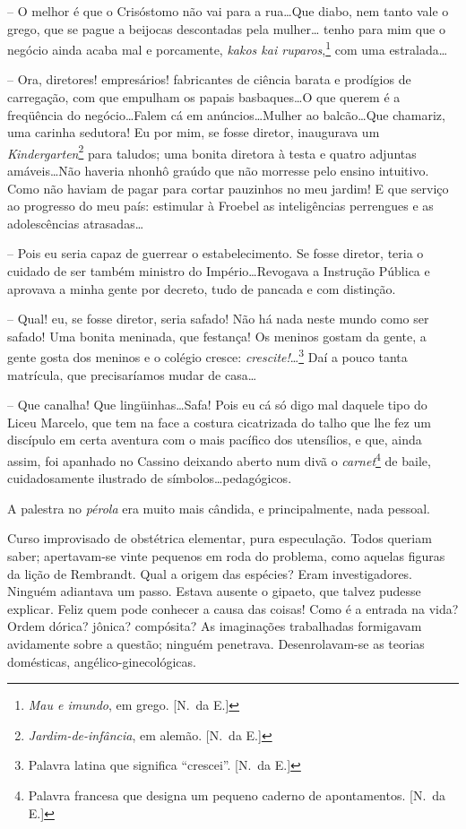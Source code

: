 -- O melhor é que o Crisóstomo não vai para a rua\ldots Que diabo, nem
tanto vale o grego, que se pague a beijocas descontadas pela mulher\ldots
tenho para mim que o negócio ainda acaba mal e porcamente, \textit{kakos kai
ruparos},\footnote{ \textit{Mau e imundo}, em grego. [N.~da E.]} com uma estralada\ldots 

-- Ora, diretores! empresários!
fabricantes de ciência barata e prodígios de carregação, com que
empulham os papais basbaques\ldots O que querem é a freqüência do
negócio\ldots Falem cá em anúncios\ldots Mulher ao balcão\ldots Que chamariz,
uma carinha sedutora! Eu por mim, se fosse diretor, inaugurava um
\textit{Kindergarten}\footnote{ \textit{Jardim-de-infância}, em alemão. [N.~da E.]} 
para taludos; uma bonita diretora à testa e quatro
adjuntas amáveis\ldots Não haveria nhonhô graúdo que não morresse pelo
ensino intuitivo. Como não haviam de pagar para cortar pauzinhos no meu
jardim! E que serviço ao progresso do meu país: estimular à Froebel as
inteligências perrengues e as adolescências atrasadas\ldots 

-- Pois eu seria capaz de guerrear o estabelecimento. Se fosse diretor, 
teria o cuidado de ser também ministro do Império\ldots Revogava a Instrução
Pública e aprovava a minha gente por decreto, tudo de pancada e com
distinção. 

-- Qual! eu, se fosse diretor, seria safado! Não há nada
neste mundo como ser safado! Uma bonita meninada, que festança! Os
meninos gostam da gente, a gente gosta dos meninos e o colégio cresce:
\textit{crescite!}\ldots\footnote{ Palavra latina que significa ``crescei''. 
[N.~da E.]} Daí a pouco tanta matrícula, que precisaríamos mudar de casa\ldots 

-- Que canalha! Que lingüinhas\ldots Safa! Pois eu cá só digo mal
daquele tipo do Liceu Marcelo, que tem na face a costura cicatrizada do
talho que lhe fez um discípulo em certa aventura com o mais pacífico
dos utensílios, e que, ainda assim, foi apanhado no Cassino deixando
aberto num divã o \textit{carnet}\footnote{ Palavra francesa que designa 
um pequeno caderno de apontamentos. [N.~da E.]} de baile, cuidadosamente ilustrado de
símbolos\ldots pedagógicos. 

A palestra no \textit{pérola} era muito mais cândida, e
principalmente, nada pessoal. 

Curso improvisado de obstétrica
elementar, pura especulação. Todos queriam saber; apertavam{}-se vinte
pequenos em roda do problema, como aquelas figuras da lição de
Rembrandt. Qual a origem das espécies? Eram investigadores. Ninguém
adiantava um passo. Estava ausente o gipaeto, que talvez pudesse
explicar. Feliz quem pode conhecer a causa das coisas! Como é a entrada
na vida? Ordem dórica? jônica? compósita? As imaginações trabalhadas
formigavam avidamente sobre a questão; ninguém penetrava.
Desenrolavam{}-se as teorias domésticas, angélico{}-ginecológicas.

